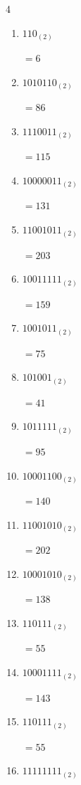 \begin{multicols}{4}
\begin{enumerate}
        $=107$

  \item $110_{(2)}$

        $=6$

  \item $1010110_{(2)}$

        $=86$

  \item $1110011_{(2)}$

        $=115$

\columnbreak %

  \item $10000011_{(2)}$

        $=131$

  \item $11001011_{(2)}$

        $=203$

  \item $10011111_{(2)}$

        $=159$

  \item $1001011_{(2)}$

        $=75$

  \item $101001_{(2)}$

        $=41$

  \item $1011111_{(2)}$

        $=95$

  \item $10001100_{(2)}$

        $=140$

  \item $11001010_{(2)}$

        $=202$

  \item $10001010_{(2)}$

        $=138$

  \item $110111_{(2)}$

        $=55$

  \item $10001111_{(2)}$

        $=143$

  \item $110111_{(2)}$

        $=55$

  \item $11111111_{(2)}$


\end{enumerate}
\end{multicols}
